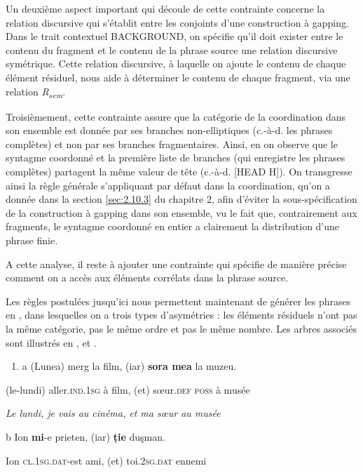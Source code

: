 Un deuxième aspect important qui découle de cette contrainte concerne la relation discursive qui s'établit entre les conjoints d'une construction à gapping. Dans le trait contextuel BACKGROUND, on spécifie qu'il doit exister entre le contenu du fragment et le contenu de la phrase source une relation discursive symétrique. Cette relation discursive, à laquelle on ajoute le contenu de chaque élément résiduel, nous aide à déterminer le contenu de chaque fragment, via une relation \textit{R}\textit{\textsubscript{sem}}. 

Troisièmement, cette contrainte assure que la catégorie de la coordination dans son ensemble est donnée par ses branches non-elliptiques (c.-à-d. les phrases complètes) et non par ses branches fragmentaires. Ainsi, en  on observe que le syntagme coordonné et la première liste de branches (qui enregistre les phrases complètes) partagent la même valeur de tête (c.-à-d. [HEAD H]). On transgresse ainsi la règle générale s'appliquant par défaut dans la coordination, qu'on a donnée dans la section \ref{sec:2.10.3} du chapitre 2, afin d'éviter la sous-spécification de la construction à gapping dans son ensemble, vu le fait que, contrairement aux fragments, le syntagme coordonné en entier a clairement la distribution d'une phrase finie. 

A cette analyse, il reste à ajouter une contrainte qui spécifie de manière précise comment on a accès aux éléments corrélats dans la phrase source. 

Les règles postulées jusqu'ici nous permettent maintenant de générer les phrases en , dans lesquelles on a trois types d'asymétries : les éléments résiduels n'ont pas la même catégorie, pas le même ordre et pas le même nombre. Les arbres associés sont illustrés en ,  et . 


\begin{enumerate}
\item \label{bkm:Ref299962029}a  (Lunea) merg la film, (iar) \textbf{sora mea} la muzeu.


\end{enumerate}
(le-lundi) aller.\textsc{ind.1sg} à film, (et) s{\oe}ur.\textsc{def poss} à musée 

    \textit{Le lundi, je vais au cinéma, et ma s{\oe}ur au musée } 

  b  Ion \textbf{mi}-e prieten, (iar) \textbf{ție} duşman.

    Ion \textsc{cl.1sg.dat-}est ami, (et) toi\textsc{.2sg.dat} ennemi 

